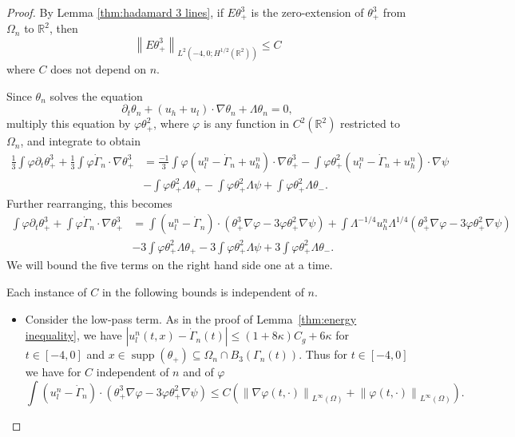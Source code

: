 \documentclass[11pt]{amsart}
\theoremstyle{remark}
\theoremstyle{definition}
\newcommand{\R}{\mathbb{R}}
\newcommand{\norm}[1]{\left\lVert#1\right\rVert}
\newcommand{\paren}[1]{\left( #1 \right)}
\DeclareMathOperator{\supp}{supp}
\newcommand{\del}{\partial}
\newcommand{\grad}{\nabla}
\newcommand{\ulow}{u_l}
\newcommand{\uhigh}{u_h}
\newcommand{\Cgamma}{C_g}
\begin{document}
\begin{proof}
By Lemma \ref{thm:hadamard 3 lines}, if $E \theta_+^3$ is the zero-extension of $\theta_+^3$ from $\Omega_n$ to $\R^2$, then
\begin{equation} \label{theta3 compact in space} \norm{ E \theta_+^3}_{L^2(-4,0; H^{1/2}(\R^2))} \leq C \end{equation}
where $C$ does not depend on $n$.  

Since $\theta_n$ solves the equation
\[ \del_t \theta_n + (\uhigh + \ulow)\cdot \grad \theta_n + \Lambda \theta_n = 0, \] 
multiply this equation by $\varphi \theta_+^2$, where $\varphi$ is any function in $C^2(\R^2)$ restricted to $\Omega_n$, and integrate to obtain
\begin{align*} 
\frac{1}{3} \int \varphi \del_t \theta_+^3 + \frac{1}{3} \int \varphi \dot{\Gamma}_n \cdot \grad \theta_+^3 &= \frac{-1}{3} \int \varphi (\ulow^n - \dot{\Gamma}_n + \uhigh^n) \cdot \grad \theta_+^3 - \int \varphi \theta_+^2 (\ulow^n - \dot{\Gamma}_n + \uhigh^n) \cdot \grad \psi 
\\ & - \int \varphi \theta_+^2 \Lambda \theta_+ - \int \varphi \theta_+^2 \Lambda \psi + \int \varphi \theta_+^2 \Lambda \theta_-. 
\end{align*}
Further rearranging, this becomes
\begin{align*} 
\int \varphi \del_t \theta_+^3 + \int \varphi \dot{\Gamma}_n \cdot \grad \theta_+^3 
&= \int (\ulow^n - \dot{\Gamma}_n) \cdot (\theta_+^3 \grad\varphi - 3 \varphi \theta_+^2 \grad\psi) + \int \Lambda^{-1/4} \uhigh^n \Lambda^{1/4} \paren{\theta_+^3 \grad\varphi - 3 \varphi \theta_+^2 \grad\psi}
\\ & - 3\int \varphi \theta_+^2 \Lambda \theta_+ - 3\int \varphi \theta_+^2 \Lambda \psi + 3\int \varphi \theta_+^2 \Lambda \theta_-. 
\end{align*}
We will bound the five terms on the right hand side one at a time.  

Each instance of $C$ in the following bounds is independent of $n$.  

\begin{itemize}
\item Consider the low-pass term.  As in the proof of Lemma~\ref{thm:energy inequality}, we have $|\ulow^n(t,x) - \dot{\Gamma}_n(t)| \leq (1+8\kappa)\Cgamma + 6 \kappa$ for $t \in [-4,0]$ and $x \in \supp(\theta_+) \subseteq \Omega_n \cap B_3(\Gamma_n(t))$.  Thus for $t \in [-4,0]$ we have for $C$ independent of $n$ and of $\varphi$
\[ \int (\ulow^n - \dot{\Gamma}_n) \cdot (\theta_+^3 \grad\varphi - 3 \varphi \theta_+^2 \grad\psi) \leq C \paren{\norm{\grad\varphi(t,\cdot)}_{L^\infty(\Omega)} + \norm{\varphi(t,\cdot)}_{L^\infty(\Omega)}}. \]


\end{itemize}
\end{proof}
\end{document}
